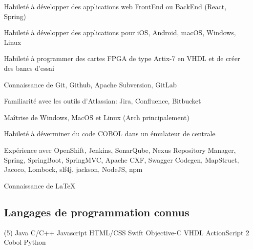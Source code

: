 \begin{cvitems}
\item{Habileté à développer des applications web FrontEnd ou BackEnd (React, Spring)}
\item{Habileté à développer des applications pour iOS, Android, macOS, Windows, Linux}
\item{Habileté à programmer des cartes FPGA de type Artix-7 en VHDL et de créer des bancs d'essai}
\item{Connaissance de Git, Github, Apache Subversion, GitLab}
\item{Familiarité avec les outils d'Atlassian: Jira, Confluence, Bitbucket}
\item{Maîtrise de Windows, MacOS et Linux (Arch principalement)}
\item{Habileté à déverminer du code COBOL dans un émulateur de centrale}
\item{Expérience avec OpenShift, Jenkins, SonarQube, Nexus Repository Manager, Spring, SpringBoot, SpringMVC, Apache CXF, Swagger Codegen, MapStruct, Jacoco, Lombock, slf4j, jackson, NodeJS, npm}
\item{Connaissance de LaTeX}
\end{cvitems}
\subsection*{Langages de programmation connus}
\begin{tasks}(5)
    \task[•] Java \task[•] C/C++
    \task[•] Javascript \task[•] HTML/CSS
    \task[•] Swift \task[•] Objective-C
    \task[•] VHDL \task[•] ActionScript 2
    \task[•] Cobol  \task[•] Python
\end{tasks}
